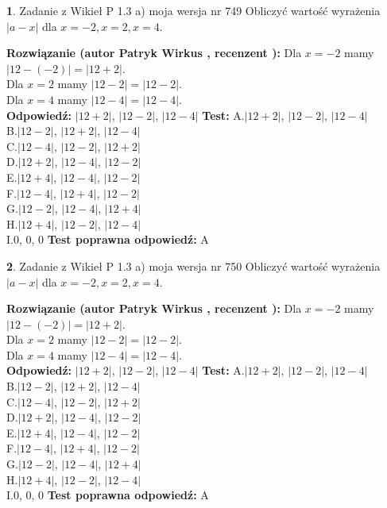 \documentclass[12pt, a4paper]{article}
\theoremstyle{definition} %
\newtheorem{zad}{}
\newcommand{\zadStart}[1]{\begin{zad}#1\newline}
\newcommand{\zadStop}{\end{zad}}
\newcommand{\rozwStart}[2]{\noindent \textbf{Rozwiązanie (autor #1 , recenzent #2): }\newline}
\newcommand{\rozwStop}{\newline}
\newcommand{\odpStart}{\noindent \textbf{Odpowiedź:}\newline}
\newcommand{\odpStop}{\newline}
\newcommand{\testStart}{\noindent \textbf{Test:}\newline}
\newcommand{\testStop}{\newline}
\newcommand{\kluczStart}{\noindent \textbf{Test poprawna odpowiedź:}\newline}
\newcommand{\kluczStop}{\newline}
\begin{document}
\zadStart{Zadanie z Wikieł P 1.3 a) moja wersja nr 749}
Obliczyć wartość wyrażenia $|a - x|$ dla $x=-2,x=2,x=4$.
\zadStop
\rozwStart{Patryk Wirkus}{}
Dla $x = -2$ mamy $|12 - (-2)| = |12 + 2|$.\\
Dla $x = 2$ mamy $|12 - 2| = |12 - 2|$.\\
Dla $x = 4$ mamy $|12 - 4| = |12 - 4|$.\\
\rozwStop
\odpStart
$|12 + 2|$, $|12 - 2|$, $|12 - 4|$
\odpStop
\testStart
A.$|12 + 2|$, $|12 - 2|$, $|12 - 4|$\\
B.$|12 - 2|$, $|12 + 2|$, $|12 - 4|$\\
C.$|12 - 4|$, $|12 - 2|$, $|12 + 2|$\\
D.$|12 + 2|$, $|12 - 4|$, $|12 - 2|$\\
E.$|12 + 4|$, $|12 - 4|$, $|12 - 2|$\\
F.$|12 - 4|$, $|12 + 4|$, $|12 - 2|$\\
G.$|12 - 2|$, $|12 - 4|$, $|12 + 4|$\\
H.$|12 + 4|$, $|12 - 2|$, $|12 - 4|$\\
I.$0$, $0$, $0$
\testStop
\kluczStart
A
\kluczStop



\zadStart{Zadanie z Wikieł P 1.3 a) moja wersja nr 750}
Obliczyć wartość wyrażenia $|a - x|$ dla $x=-2,x=2,x=4$.
\zadStop
\rozwStart{Patryk Wirkus}{}
Dla $x = -2$ mamy $|12 - (-2)| = |12 + 2|$.\\
Dla $x = 2$ mamy $|12 - 2| = |12 - 2|$.\\
Dla $x = 4$ mamy $|12 - 4| = |12 - 4|$.\\
\rozwStop
\odpStart
$|12 + 2|$, $|12 - 2|$, $|12 - 4|$
\odpStop
\testStart
A.$|12 + 2|$, $|12 - 2|$, $|12 - 4|$\\
B.$|12 - 2|$, $|12 + 2|$, $|12 - 4|$\\
C.$|12 - 4|$, $|12 - 2|$, $|12 + 2|$\\
D.$|12 + 2|$, $|12 - 4|$, $|12 - 2|$\\
E.$|12 + 4|$, $|12 - 4|$, $|12 - 2|$\\
F.$|12 - 4|$, $|12 + 4|$, $|12 - 2|$\\
G.$|12 - 2|$, $|12 - 4|$, $|12 + 4|$\\
H.$|12 + 4|$, $|12 - 2|$, $|12 - 4|$\\
I.$0$, $0$, $0$
\testStop
\kluczStart
A
\kluczStop
\end{document}
